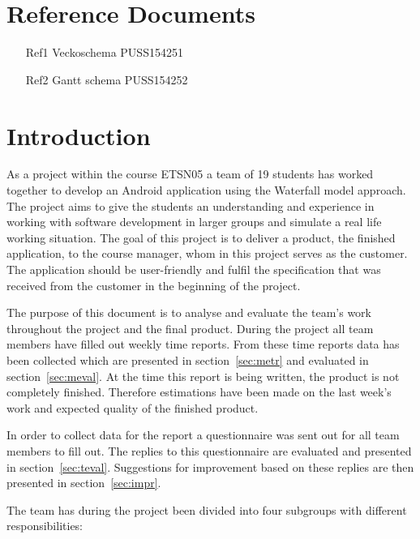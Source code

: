 \documentclass[a4paper]{article}
\begin{document}
\section{Reference Documents}
\begin{enumerate}

\item[Ref1] Veckoschema PUSS154251

\item[Ref2] Gantt schema PUSS154252 

\end{enumerate}


\section{Introduction}

As a project within the course ETSN05 a team of 19 students has worked together to develop an Android application using the Waterfall model approach. The project aims to give the students an understanding and experience in working with software development in larger groups and simulate a real life working situation. The goal of this project is to deliver a product, the finished application, to the course manager, whom in this project serves as the customer. The application should be user-friendly and fulfil the specification that was received from the customer in the beginning of the project.

The purpose of this document is to analyse and evaluate the team’s work throughout the project and the final product. During the project all team members have filled out weekly time reports. From these time reports data has been collected which are presented in section~\ref{sec:metr} and evaluated in section~\ref{sec:meval}.
At the time this report is being written, the product is not completely finished. Therefore estimations have been made on the last week's work and expected quality of the finished product. 

In order to collect data for the report a questionnaire was sent out for all team members to fill out. The replies to this questionnaire are evaluated and presented in section~\ref{sec:teval}. Suggestions for improvement based on these replies are then presented in section~\ref{sec:impr}.

The team has during the project been divided into four subgroups with different responsibilities:
\end{document}
